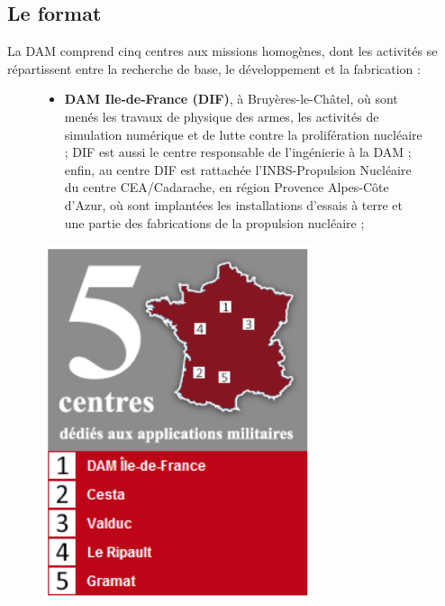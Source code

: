 \documentclass[12pt,a4paper,twoside]{article}
\begin{document}
    \subsection*{Le format}
    La DAM comprend cinq centres aux missions homogènes, dont les activités se
    répartissent entre la recherche de base, le développement et la fabrication :
    \begin{figure}[!ht]
        \begin{minipage}{0.6\linewidth}
            \begin{itemize}[label=\textbullet]
                \item
                {\bf DAM Ile-de-France (DIF)}, à Bruyères-le-Châtel, où sont
                menés les travaux de physique des armes, les activités de
                simulation numérique et de lutte contre la prolifération
                nucléaire ; DIF est aussi le centre responsable de l'ingénierie
                à la DAM ; enfin, au centre DIF est rattachée l'INBS-Propulsion
                Nucléaire du centre CEA/Cadarache, en région Provence Alpes-Côte
                d'Azur, où sont implantées les installations d'essais à terre et
                une partie des fabrications de la propulsion nucléaire ;
            \end{itemize}
        \end{minipage}
        \begin{minipage}{0.4\linewidth}
            \centering
            \includegraphics[width=0.7\textwidth]{ressources/images/dam/5_centres.png}
        \end{minipage}
    \end{figure}
\end{document}
